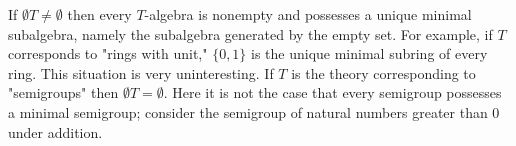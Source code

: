 If $\emptyset T \neq \emptyset$ then every $T$-algebra is nonempty and possesses a unique minimal subalgebra, namely the subalgebra generated by the empty set. For example, if $T$ corresponds to "rings with unit," $\{0, 1\}$ is the unique minimal subring of every ring. This situation is very uninteresting. If $T$ is the theory corresponding to "semigroups" then $\emptyset T = \emptyset$. Here it is not the case that every semigroup possesses a minimal semigroup; consider the semigroup of natural numbers greater than 0 under addition.